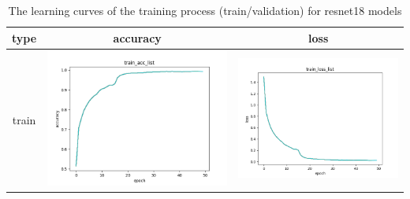 \documentclass[a4paper, 12pt]{article}
\begin{document}
\begin{table}[!htb]
    \centering
    \caption{The learning curves of the training process (train/validation) for resnet18 models}
    \begin{tabular}{|c|c|c|}
        \hline
        type & accuracy & loss \\
        \hline
        train &\includegraphics[scale=0.5]{p2/experiment/resnet18_2024_04_12_14_05_14_sgd_pre_da/log/train_acc_list.png} & \includegraphics[scale=0.5]{p2/experiment/resnet18_2024_04_12_14_05_14_sgd_pre_da/log/train_loss_list.png} \\
        \hline

\end{tabular}
\end{table}
\end{document}
